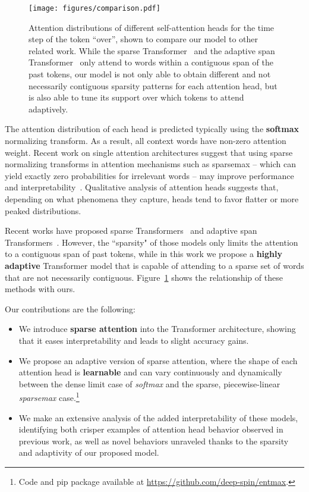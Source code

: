 \documentclass[11pt,a4paper]{article}
\newcommand{\figref}[1]{Figure~\ref{fig:#1}}
\begin{document}
\begin{figure}[t]
    \centering
    \texttt{[image: figures/comparison.pdf]}
    \caption{Attention distributions of different self-attention heads for the
    time step of the token ``over'', shown to compare our model to other
    related work. While the sparse
    Transformer~\citep{openai_sparse_transf} and the adaptive span
    Transformer~\citep{Sukhbaatar2019} only attend to words within a
    contiguous span of the past tokens, our model is not only able to
    obtain different and not necessarily contiguous sparsity patterns for
    each attention head, but is also able to tune its support over which
    tokens to attend adaptively.}
    \label{fig:comparison}
\end{figure}

The attention distribution of each head is predicted typically using
the \textbf{softmax} normalizing transform. As a result, all context
words have non-zero attention weight. Recent work on single attention
architectures suggest that using sparse normalizing transforms in
attention mechanisms such as sparsemax -- which can yield exactly
zero probabilities for irrelevant words -- may improve performance
and interpretability~\citep{malaviya2018sparse,deng2018latent,entmax}. Qualitative
analysis of attention heads \citep[Figure~5]{vaswani2017attention}
suggests that, depending on what phenomena they capture, heads tend
to favor flatter or more peaked distributions.

Recent works have proposed sparse Transformers~\citep{openai_sparse_transf} and adaptive span
Transformers~\citep{Sukhbaatar2019}. However,
the ``sparsity" of those models only limits the attention to a
contiguous span of past tokens, while in this work
we propose a \textbf{highly adaptive} Transformer model
that is capable of attending to a sparse set of words that are not
necessarily contiguous. \figref{comparison} shows the relationship of
these methods with ours.

Our contributions are the following:

\begin{itemize}
\item We introduce \textbf{sparse attention} into the
Transformer architecture, showing that it eases
interpretability and leads to slight accuracy gains.
\item We propose an adaptive version of sparse attention,
where the shape of each attention head is {\bf learnable} and can vary continuously and
dynamically between the dense limit case of \emph{softmax} and the sparse,
piecewise-linear \emph{sparsemax} case.\footnote{
Code and pip package available at \url{https://github.com/deep-spin/entmax}.}
\item We make an extensive analysis of the added interpretability of these
models, identifying both crisper examples of attention head behavior observed in
previous work, as well as novel behaviors unraveled thanks to the sparsity
and adaptivity of our proposed model.
\end{itemize}
\end{document}
